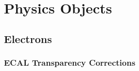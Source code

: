 \chapter{Physics Objects}

\section{Electrons}
\subsection{\ac{ECAL} Transparency Corrections}
\label{sec:reco_ecal_transparency}